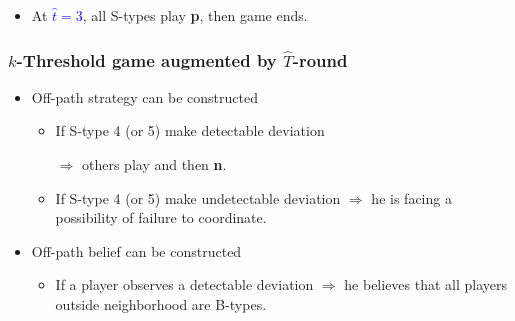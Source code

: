 \documentclass[8pt]{beamer}
\begin{document}
\begin{frame}
\begin{itemize}
\begin{itemize}
\pause
\item At \textcolor{blue}{$\hat{t}=3$}, all S-types play \textbf{p}, then game ends.

\end{itemize}

\end{itemize}



\end{frame}


\begin{frame}
  \frametitle{$k$-Threshold game augmented by $\hat{T}$-round }


\begin{itemize}

\item <1-> Off-path strategy can be constructed
\begin{itemize}
\item <2-> If S-type 4 (or 5) make detectable deviation 

$\Rightarrow$ others play  and then \textbf{n}.
\item<2-> If S-type 4 (or 5) make undetectable deviation $\Rightarrow$ he is facing a possibility of failure to coordinate.
\end{itemize}
\item <1-> Off-path belief can be constructed
\begin{itemize}
\item <2-> If a player observes a detectable deviation $\Rightarrow$ he believes that all players outside neighborhood are B-types. 
\end{itemize}
\end{itemize}



\end{frame}
\end{document}

